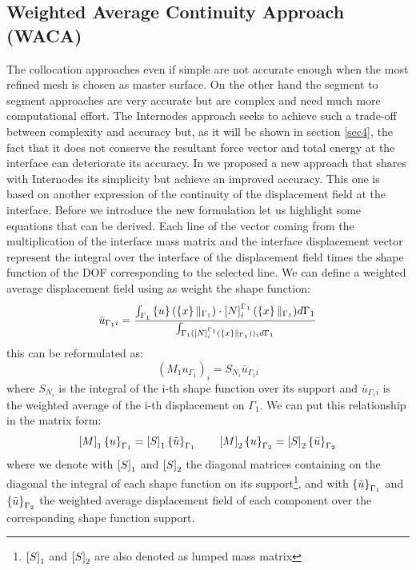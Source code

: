 \subsection{Weighted Average Continuity Approach (WACA)}\label{sssec36}
The collocation approaches even if simple are not accurate enough when the most refined mesh is chosen as master surface. On the other hand the segment to segment approaches are very accurate but are complex and need much more computational effort. The Internodes approach seeks to achieve such a trade-off between complexity and accuracy but, as it will be shown in section \ref{sec4}, the fact that it does not conserve the resultant force vector and total energy at the interface can deteriorate its accuracy. In \cite{coniglio2018weighted} we proposed a new approach that shares with Internodes its simplicity but achieve an improved accuracy.
This one is based on another expression of the continuity of the displacement field at the interface. Before we introduce the new formulation let us highlight some equations that can be derived. Each line of the vector coming from the multiplication of the interface mass matrix and the interface displacement vector represent the integral over the interface of the displacement field times the shape function of the DOF corresponding to the selected line. We can define a weighted average displacement field using as weight the shape function:
\begin{equation}
\label{eq.73a}
\bar{u}_{\Gamma_1i}=\frac{\int_{\Gamma_1}\left\lbrace{u}\right \rbrace(\left\lbrace{x}\right \rbrace\|_{\Gamma_1})\cdot\left[{N}\right]_{i}^{\Gamma_1}(\left\lbrace{x}\right \rbrace\|_{\Gamma_1})d\Gamma_1}{\int_{\Gamma_1(\left[{N}\right]_{i}^{\Gamma_1}(\left\lbrace{x}\right \rbrace\|_{\Gamma_1}))_id\Gamma_1}}
\end{equation}
this can be reformulated as:
\begin{equation}
\label{eq.73}
({M}_{1}{u}_{\Gamma_1})_i=S_{N_i}\bar{u}_{\Gamma_1i}
\end{equation}
where $S_{N_i}$ is the integral of the i-th shape function over its support  and $\bar{u}_{\Gamma_1i}$ is the weighted average of the i-th displacement on $\Gamma_1$. 
We can put this relationship in the matrix form:
\begin{eqnarray}
\label{eq.74}
\left[{M}\right]_{1}\left\lbrace{u}\right \rbrace_{\Gamma_1}=\left[{S}\right]_1\left\lbrace{\bar{u}}\right \rbrace_{\Gamma_1}\qquad
\left[{M}\right]_{2}\left\lbrace{u}\right \rbrace_{\Gamma_2}=\left[{S}\right]_2\left\lbrace{\bar{u}}\right \rbrace_{\Gamma_2}
\end{eqnarray}
where we denote with $\left[{S}\right]_1$ and $\left[{S}\right]_2$ the diagonal matrices containing on the diagonal the integral of each shape function on its support\footnote{$\left[{S}\right]_1$ and $\left[{S}\right]_2$ are also denoted as lumped mass matrix}, and with $\left\lbrace{\bar{u}}\right \rbrace_{\Gamma_1}$ and $\left\lbrace{\bar{u}}\right \rbrace_{\Gamma_2}$ the weighted average displacement field of each component over the corresponding shape function support.
